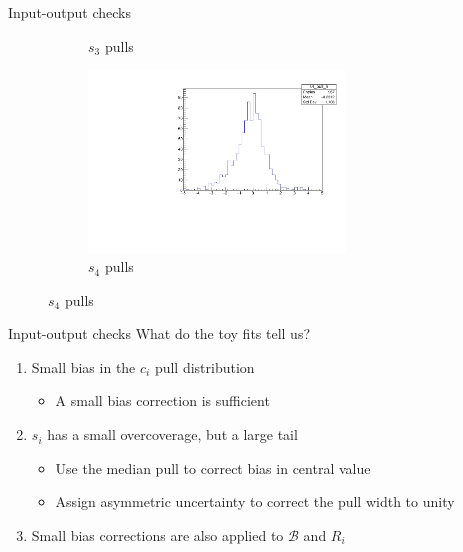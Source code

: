 \documentclass{beamer}
\begin{document}
\begin{frame}{Input-output checks}
\begin{figure}
\begin{subfigure}{0.5\textwidth}
      \caption{$s_3$ pulls}
    \end{subfigure}%
    \begin{subfigure}{0.5\textwidth}
      \centering
      \includegraphics[width=0.75\textwidth]{Plots/s4_ToyFits_pull.pdf}
      \caption{$s_4$ pulls}
    \end{subfigure}
  \end{figure}
\end{frame}

\begin{frame}{Input-output checks}
  \vspace{0.0cm}
  {\Large What do the toy fits tell us?}
  \vspace{1.0cm}
  \begin{enumerate}
    \setlength\itemsep{2.0em}
    \item{Small bias in the $c_i$ pull distribution}
    \begin{itemize}
      \item{A small bias correction is sufficient}
    \end{itemize}
    \item{$s_i$ has a small overcoverage, but a large tail}
    \begin{itemize}
      \item{Use the median pull to correct bias in central value}
      \item{Assign asymmetric uncertainty to correct the pull width to unity}
    \end{itemize}
    \item{Small bias corrections are also applied to $\mathcal{B}$ and $R_i$}
  \end{enumerate}
\end{frame}
\end{document}
